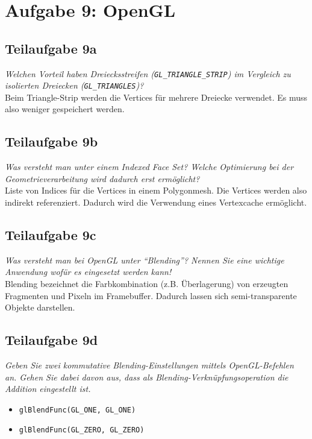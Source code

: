 \documentclass[a4paper]{scrartcl}
\begin{document}
\section*{Aufgabe 9: OpenGL}
\subsection*{Teilaufgabe 9a}
\textit{Welchen Vorteil haben Dreiecksstreifen (\texttt{GL\_TRIANGLE\_STRIP})
im Vergleich zu isolierten Dreiecken (\texttt{GL\_TRIANGLES})?}\\
Beim Triangle-Strip werden die Vertices für mehrere Dreiecke verwendet. Es muss
also weniger gespeichert werden.

\subsection*{Teilaufgabe 9b}
\textit{Was versteht man unter einem Indexed Face Set? Welche Optimierung bei
der Geometrieverarbeitung wird dadurch erst ermöglicht?}\\
Liste von Indices für die Vertices in einem Polygonmesh. Die Vertices werden
also indirekt referenziert. Dadurch wird die Verwendung eines Vertexcache
ermöglicht.

\subsection*{Teilaufgabe 9c}
\textit{Was versteht man bei OpenGL unter \enquote{Blending}? Nennen Sie eine
wichtige Anwendung wofür es eingesetzt werden kann!}\\
Blending bezeichnet die Farbkombination (z.B. Überlagerung) von erzeugten
Fragmenten und Pixeln im Framebuffer. Dadurch lassen sich semi-transparente
Objekte darstellen.

\subsection*{Teilaufgabe 9d}
\textit{Geben Sie zwei kommutative Blending-Einstellungen mittels OpenGL-Befehlen an.
Gehen Sie dabei davon aus, dass als Blending-Verknüpfungsoperation die Addition
eingestellt ist.}\\

\begin{itemize}
    \item \texttt{glBlendFunc(GL\_ONE, GL\_ONE)}
    \item \texttt{glBlendFunc(GL\_ZERO, GL\_ZERO)}
\end{itemize}
\end{document}
